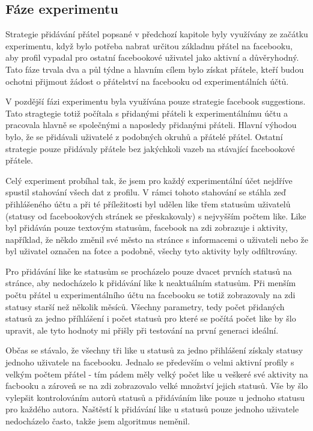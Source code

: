 \documentclass[thesis=M,czech]{FITthesis}[2013/05/10]
\begin{document}
\subsection{Fáze experimentu}

Strategie přidávání přátel popsané v předchozí kapitole byly využívány ze začátku experimentu, když bylo potřeba nabrat určitou základnu přátel na facebooku, aby profil vypadal pro ostatní facebookové uživatel jako aktivní a důvěryhodný. Tato fáze trvala dva a půl týdne a hlavním cílem bylo získat přátele, kteří budou ochotni přijmout žádost o přátelství na facebooku od experimentálních účtů. 

V pozdější fázi experimentu byla využívána pouze strategie facebook suggestions. Tato stragtegie totiž počítala s přidanými přáteli k experimentálnímu účtu a pracovala hlavně se společnými a naposledy přidanými přáteli. Hlavní výhodou bylo, že se přidávali uživatelé z podobných okruhů a přátelé přátel. Ostatní strategie pouze přidávaly přátele bez jakýchkoli vazeb na stávající facebookové přátele. 

Celý experiment probíhal tak, že jsem pro každý experimentální účet nejdříve spustil stahování všech dat z profilu. V rámci tohoto stahování se stáhla zeď přihlášeného účtu a při té příležitosti byl udělen like třem statusům uživatelů (statusy od facebookových stránek se přeskakovaly) s nejvyšším počtem like. Like byl přidáván pouze textovým statusům, facebook na zdi zobrazuje i aktivity, například, že někdo změnil své město na stránce s informacemi o uživateli nebo že byl uživatel označen na fotce a podobně, všechy tyto aktivity byly odfiltrovány. 

Pro přidávání like ke statusům se procházelo pouze dvacet prvních statusů na stránce, aby nedocházelo k přidávání like k neaktuálním statusům. Při menším počtu přátel u experimentálního účtu na facebooku se totiž zobrazovaly na zdi statusy starší než několik měsíců. Všechny parametry, tedy počet přidaných statusů za jedno příhlášení i počet statusů pro které se počítá počet like by šlo upravit, ale tyto hodnoty mi přišly při testování na první generaci ideální.

Občas se stávalo, že všechny tři like u statusů za jedno přihlášení získaly statusy jednoho uživatele na facebooku. Jednalo se především o velmi aktivní profily s velkým počtem přátel - tím pádem měly velký počet like u veškeré své aktivity na facbooku a zároveň se na zdi zobrazovalo velké množství jejich statusů. Vše by šlo vylepšit kontrolováním autorů statusů a přidáváním like pouze u jednoho statusu pro každého autora. Naštěstí k přidávání like u statusů pouze jednoho uživatele nedocházelo často, takže jsem algoritmus neměnil.
\end{document}

